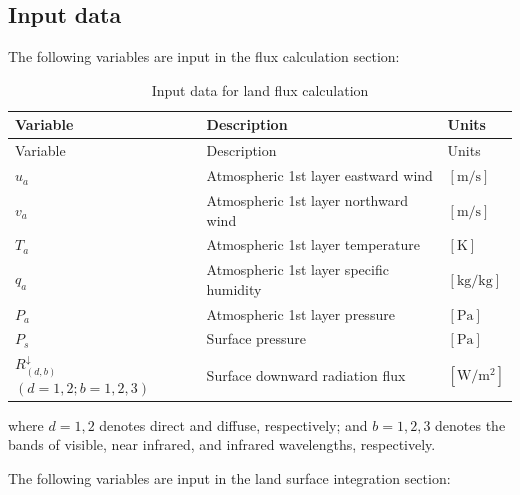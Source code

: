 \hypertarget{input-data}{%
\subsection{Input data}\label{input-data}}

The following variables are input in the flux calculation section:

\begin{longtable}[]{@{}lll@{}}
\caption{Input data for land flux calculation}\tabularnewline
\toprule
Variable & Description & Units \\
\midrule
\endfirsthead
\toprule
Variable & Description & Units \\
\midrule
\endhead
\(u_a\) & Atmospheric 1st layer eastward wind & \(\mathrm{[m/s]}\) \\
\(v_a\) & Atmospheric 1st layer northward wind & \(\mathrm{[m/s]}\) \\
\(T_a\) & Atmospheric 1st layer temperature & \(\mathrm{[K]}\) \\
\(q_a\) & Atmospheric 1st layer specific humidity & \(\mathrm{[kg/kg]}\) \\
\(P_a\) & Atmospheric 1st layer pressure & \(\mathrm{[Pa]}\) \\
\(P_s\) & Surface pressure & \(\mathrm{[Pa]}\) \\
\(R^{\downarrow}_{(d,b)}\) \((d=1,2;b=1,2,3)\) & Surface downward radiation flux & \(\mathrm{[W/m^2]}\) \\
\bottomrule
\end{longtable}

where \(d=1,2\) denotes direct and diffuse, respectively; and \(b=1,2,3\) denotes the bands of visible, near infrared, and infrared wavelengths, respectively.

The following variables are input in the land surface integration section:

